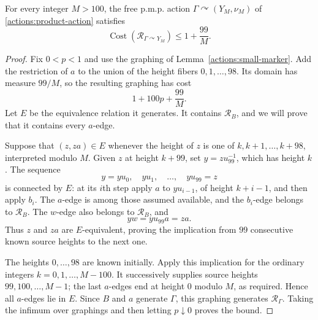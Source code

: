 \begin{proposition}
\label{actions:low}
For every integer $M>100$, the free p.m.p. action
$\Gamma\curvearrowright(Y_M,\nu_M)$ of
\eqref{actions:product-action} satisfies
\[
 \operatorname{Cost}(\mathcal R_{\Gamma\curvearrowright Y_M})
 \leq1+\frac{99}{M}.
\]
\end{proposition}

\begin{proof}
Fix $0<p<1$ and use the graphing of
Lemma~\ref{actions:small-marker}.  Add the restriction of $a$ to
the union of the height fibers $0,1,\ldots,98$.  Its domain has
measure $99/M$, so the resulting graphing has cost
\[
 1+100p+\frac{99}{M}.
\]
Let $E$ be the equivalence relation it generates.  It contains
$\mathcal R_B$, and we will prove that it contains every $a$-edge.

Suppose that $(z,za)\in E$ whenever the height of $z$ is one of
$k,k+1,\ldots,k+98$, interpreted modulo $M$.  Given $z$ at height
$k+99$, set $y=zu_{99}^{-1}$, which has height $k$.
The sequence
\[
 y=yu_0,\quad yu_1,\quad\ldots,\quad yu_{99}=z
\]
is connected by $E$: at its $i$th step apply $a$ to $yu_{i-1}$,
of height $k+i-1$, and then apply $b_i$.  The $a$-edge is among
those assumed available, and the $b_i$-edge belongs to
$\mathcal R_B$.  The $w$-edge also belongs to $\mathcal R_B$, and
\[
 yw=yu_{99}a=za.
\]
Thus $z$ and $za$ are $E$-equivalent, proving the implication from
$99$ consecutive known source heights to the next one.

The heights $0,\ldots,98$ are known initially.  Apply this
implication for the ordinary integers
$k=0,1,\ldots,M-100$.  It successively supplies source heights
$99,100,\ldots,M-1$; the last $a$-edges end at height $0$ modulo
$M$, as required.  Hence all $a$-edges lie in $E$.
Since $B$ and $a$ generate $\Gamma$, this graphing generates
$\mathcal R_\Gamma$.  Taking the infimum over graphings and then
letting $p\downarrow0$ proves the bound.
\end{proof}
